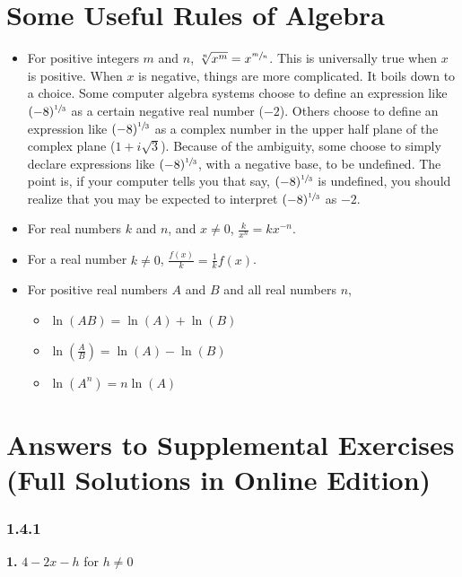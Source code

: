 \documentclass[12pt,]{book}
\theoremstyle{plain}
\theoremstyle{definition}
\numberwithin{equation}{section}
\newcommand{\fe}[2]{#1\mathopen{}\left(#2\right)\mathclose{}}
\begin{document}
\chapter[Some Useful Rules of Algebra]{Some Useful Rules of Algebra}\label{appendix-useful-algebra}
\begin{itemize}[label=\textbullet]
\item{}For positive integers \(m\) and \(n\), \(\sqrt[n]{x^m}=x^{\sfrac{m}{n}}\). This is universally true when \(x\) is positive. When \(x\) is negative, things are more complicated. It boils down to a choice. Some computer algebra systems choose to define an expression like \((-8)^{\sfrac{1}{3}}\) as a certain negative real number (\(-2\)). Others choose to define an expression like \((-8)^{\sfrac{1}{3}}\) as a complex number in the upper half plane of the complex plane (\(1+i\sqrt{3}\)). Because of the ambiguity, some choose to simply declare expressions like \((-8)^{\sfrac{1}{3}}\), with a negative base, to be undefined. The point is, if your computer tells you that say, \((-8)^{\sfrac{1}{3}}\) is undefined, you should realize that you may be expected to interpret \((-8)^{\sfrac{1}{3}}\) as \(-2\).\item{}For real numbers \(k\) and \(n\), and \(x\neq0\), \(\frac{k}{x^n}=kx^{-n}\).\item{}For a real number \(k\neq0\), \(\frac{\fe{f}{x}}{k}=\frac{1}{k}\fe{f}{x}\).\item{}For positive real numbers \(A\) and \(B\) and all real numbers \(n\), 
            \begin{itemize}[label=$\circ$]
\item{}\(\fe{\ln}{AB}=\fe{\ln}{A}+\fe{\ln}{B}\)\item{}\(\fe{\ln}{\frac{A}{B}}=\fe{\ln}{A}-\fe{\ln}{B}\)\item{}\(\fe{\ln}{A^n}=n\fe{\ln}{A}\)\end{itemize}

        \end{itemize}
%
\backmatter
%
\typeout{************************************************}
\typeout{************************************************}
\chapter[Answers to Supplemental Exercises]{Answers to Supplemental Exercises (Full Solutions in Online Edition)}\label{section-63}
\subsection*{1.4.1 }
\noindent\textbf{1.}\quad{}
                    \(4-2x-h\) for \(h\neq0\)%
\end{document}
